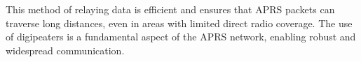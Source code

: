 This method of relaying data is efficient and ensures that APRS packets can traverse long distances, even in areas with limited direct radio coverage. The use of digipeaters is a fundamental aspect of the APRS network, enabling robust and widespread communication.

